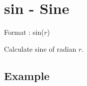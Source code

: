 
%

\section{sin - Sine\label{sect:sin}}

Format : sin($r$)

Calculate sine of radian $r$.

\subsection*{Example}


%

